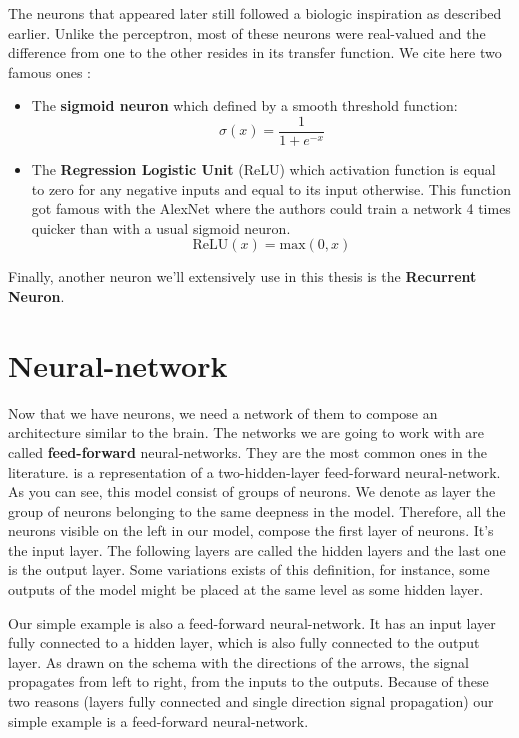 		The neurons that appeared later still followed a biologic inspiration as described earlier. Unlike the perceptron, most of these neurons were real-valued and the difference from one to the other resides in its transfer function. We cite here two famous ones :
		\begin{itemize}
			\item The \textbf{sigmoid neuron} which defined by a smooth threshold function:
			$$ \sigma(x) = \frac{1}{1 + e^{-x}} $$
			\item The \textbf{Regression Logistic Unit} (ReLU) which activation function is equal to zero for any negative inputs and equal to its input otherwise. This function got famous with the AlexNet \cite{krizhevsky2012imagenet} where the authors could train a network 4 times quicker than with a usual sigmoid neuron.
			$$ \text{ReLU}(x) = \text{max}(0,x) $$
		\end{itemize}

		Finally, another neuron we'll extensively use in this thesis is the \textbf{Recurrent Neuron}. 


	\section{Neural-network}
		Now that we have neurons, we need a network of them to compose an architecture similar to the brain. The networks we are going to work with are called \textbf{feed-forward} neural-networks. They are the most common ones in the literature.  is a representation of a two-hidden-layer feed-forward neural-network. As you can see, this model consist of groups of neurons. We denote as layer the group of neurons belonging to the same deepness in the model. Therefore, all the neurons visible on the left in our model, compose the first layer of neurons. It's the input layer. The following layers are called the hidden layers and the last one is the output layer. Some variations exists of this definition, for instance, some outputs of the model might be placed at the same level as some hidden layer.

		Our simple example is also a feed-forward neural-network. It has an input layer fully connected to a hidden layer, which is also fully connected to the output layer. As drawn on the schema with the directions of the arrows, the signal propagates from left to right, from the inputs to the outputs. Because of these two reasons (layers fully connected and single direction signal propagation) our simple example is a feed-forward neural-network.		

